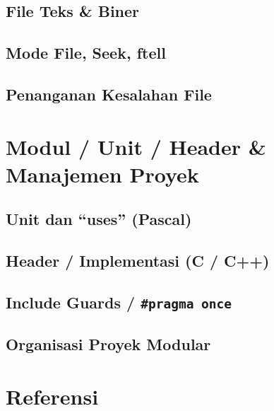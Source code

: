 \documentclass[12pt,a4paper]{book}
\begin{document}
\section{File Teks \& Biner}
\section{Mode File, Seek, ftell}
\section{Penanganan Kesalahan File}

\chapter{Modul / Unit / Header \& Manajemen Proyek}
\section{Unit dan “uses” (Pascal)}
\section{Header / Implementasi (C / C++)}
\section{Include Guards / \texttt{\#pragma once}}
\section{Organisasi Proyek Modular}

\backmatter
\chapter*{Referensi}
\end{document}
